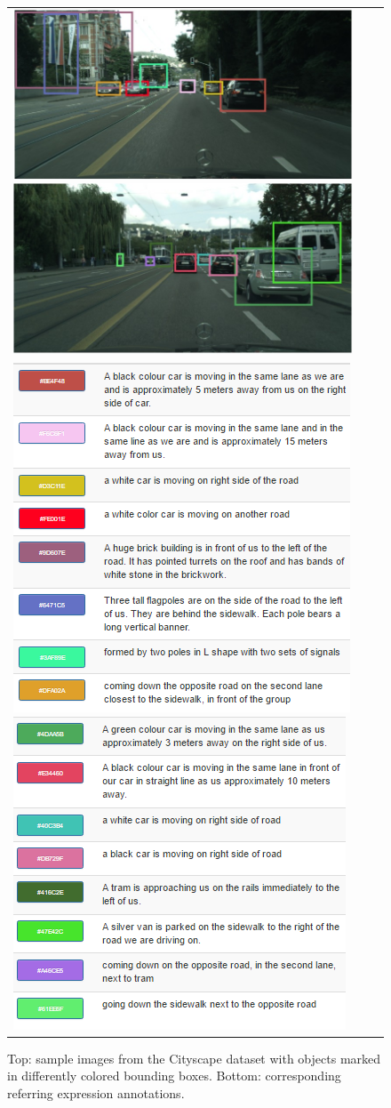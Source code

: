 \documentclass[10pt,twocolumn,letterpaper]{article}
\begin{document}
\begin{figure}[t]
\centering
\begin{tabular}{lll}
\includegraphics[width=0.5\linewidth]{pic5.jpg}
\includegraphics[width=0.5\linewidth]{pic6.jpg}
\noindent 
\noindent
\\
\noindent 
\includegraphics[width=0.5\linewidth,height=0.50\linewidth]{desc5.PNG}

\includegraphics[width=0.5\linewidth,height=0.50\linewidth]{desc6.PNG}

\end{tabular}
\caption{Top: sample images from the Cityscape dataset with objects marked in differently colored bounding boxes. Bottom: corresponding referring expression annotations.}
\label{fig:recallvsiou}
\end{figure}
\end{document}
